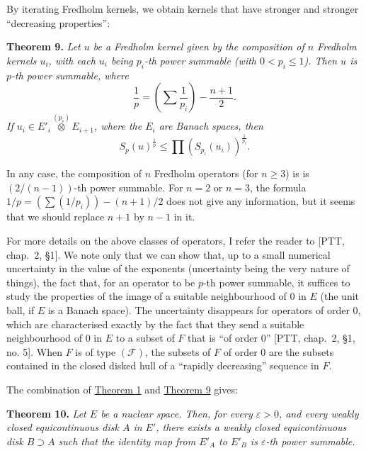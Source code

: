 \documentclass[british]{article}
\newenvironment{itenv}[1]
  {\phantomsection\par\smallskip\noindent\textbf{#1.}\itshape}
  {\par\smallskip}
\newcommand{\oldpage}[1]{\marginpar{\footnotesize$\Big\vert$ \textit{p.~#1}}}
\begin{document}
By iterating Fredholm kernels, we obtain kernels that have stronger and
stronger ``decreasing properties'':

\protect{}\label{section-2-theorem-9}
\begin{itenv}{Theorem 9}
Let \(u\) be a Fredholm kernel given by the composition of \(n\)
Fredholm kernels \(u_i\), with each \(u_i\) being \(p_i\)-th power
summable (with \(0<p_i\leqslant 1\)). Then \(u\) is \(p\)-th power
summable, where \[
  \frac1p = \left(\sum\frac{1}{p_i}\right)-\frac{n+1}{2}.
\] If \(u_i\in E'_i\overset{(p_i)}{\otimes}E_{i+1}\), where the \(E_i\)
are Banach spaces, then \[
  S_p(u)^{\frac1p} \leqslant\prod\left(S_{p_i}(u_i)\right)^{\frac{1}{p_i}}.
\]

\end{itenv}

In any case, the composition of \(n\) Fredholm operators (for
\(n\geqslant 3\)) is is \((2/(n-1))\)-th power summable. For \(n=2\) or
\(n=3\), the formula \(1/p=(\sum(1/p_i))-(n+1)/2\) does not give any
information, but it seems that we should replace \(n+1\) by \(n-1\) in
it.

\oldpage{109}

For more details on the above classes of operators, I refer the reader
to {[}PTT, chap.~2, §1{]}. We note only that we can show that, up to a
small numerical uncertainty in the value of the exponents (uncertainty
being the very nature of things), the fact that, for an operator to be
\(p\)-th power summable, it suffices to study the properties of the
image of a suitable neighbourhood of \(0\) in \(E\) (the unit ball, if
\(E\) is a Banach space). The uncertainty disappears for operators of
order \(0\), which are characterised exactly by the fact that they send
a suitable neighbourhood of \(0\) in \(E\) to a subset of \(F\) that is
``of order \(0\)'' {[}PTT, chap.~2, §1, no. 5{]}. When \(F\) is of type
\((\mathscr{F})\), the subsets of \(F\) of order \(0\) are the subsets
contained in the closed disked hull of a ``rapidly decreasing'' sequence
in \(F\).

The combination of \hyperref[section-2-theorem-1]{Theorem 1} and
\hyperref[section-2-theorem-9]{Theorem 9} gives:

\protect{}\label{section-2-theorem-10}
\begin{itenv}{Theorem 10}
Let \(E\) be a nuclear space. Then, for every \(\varepsilon>0\), and
every weakly closed equicontinuous disk \(A\) in \(E'\), there exists a
weakly closed equicontinuous disk \(B\supset A\) such that the identity
map from \(E'_A\) to \(E'_B\) is \(\varepsilon\)-th power summable.

\end{itenv}
\end{document}
